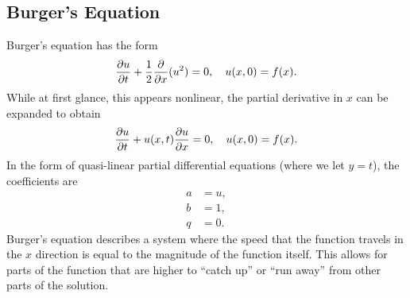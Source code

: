 \subsection{Burger's Equation}

Burger's equation has the form
\begin{align}
  \frac{ \partial {u} }{ \partial {t} } + \frac{1}{2} \frac{ \partial {} }{ \partial {x} } ( u^2 ) = 0 , \quad u(x,0) = f(x).
\end{align}
While at first glance, this appears nonlinear, the partial derivative in $x$ can be expanded to obtain
\begin{align}
  \frac{ \partial {u} }{ \partial {t} } + u(x,t) \frac{ \partial {u} }{ \partial {x} }  = 0 , \quad u(x,0) = f(x).
\end{align}
In the form of quasi-linear partial differential equations (where we let $y = t$), the coefficients are
\begin{subequations}
\begin{align}
  a &= u, \\
  b &= 1, \\
  q &= 0.
\end{align}
\end{subequations}
Burger's equation describes a system where the speed that the function travels in the $x$ direction is equal to the magnitude of the function itself. This allows for parts of the function that are higher to ``catch up'' or ``run away'' from other parts of the solution.

